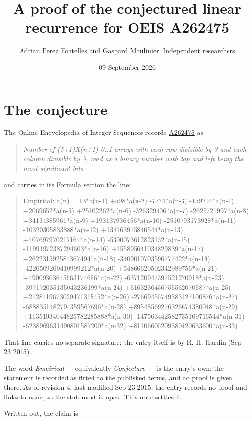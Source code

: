 \documentclass[11pt]{article}
\title{A proof of the conjectured linear recurrence for OEIS A262475}
\author{Adrian Perez Fontelles and Gaspard Moulinier, Independent researchers}
\date{09 September 2026}
\theoremstyle{definition}
\begin{document}
\maketitle
\section{The conjecture}

The Online Encyclopedia of Integer Sequences records \href{https://oeis.org/A262475}{A262475} as

\begin{quote}\itshape Number of (5+1)X(n+1) 0..1 arrays with each row divisible by 3 and each column divisible by 5, read as a binary number with top and left being the most significant bits\end{quote}

and carries in its Formula section the line:

\begin{quote}\ttfamily Empirical: a(n) = 13*a(n-1) +598*a(n-2) -7774*a(n-3) -159204*a(n-4) +2069652*a(n-5) +25102262*a(n-6) -326329406*a(n-7) -2625721997*a(n-8) +34134385961*a(n-9) +193137936456*a(n-10) -2510793173928*a(n-11) -10320305833888*a(n-12) +134163975840544*a(n-13) +407697970217164*a(n-14) -5300073612823132*a(n-15) -11991972387294603*a(n-16) +155895641034829839*a(n-17) +262231592584367494*a(n-18) -3409010703596777422*a(n-19) -4220509269410999212*a(n-20) +54866620502342989756*a(n-21) +49009303645963174686*a(n-22) -637120947397521270918*a(n-23) -397172035135043236199*a(n-24) +5163236456755562070587*a(n-25) +2128419673029471315452*a(n-26) -27669455749383127100876*a(n-27) -6888351482794359567696*a(n-28) +89548569276326674380048*a(n-29) +11351034044825782285888*a(n-30) -147563442582735169716544*a(n-31) -6238969631490801587200*a(n-32) +81106605209380420633600*a(n-33)\end{quote}

That line carries no separate signature; the entry itself is by R. H. Hardin (Sep 23 2015).

The word {\itshape Empirical} --- equivalently {\itshape Conjecture} --- is the entry's own: the statement is recorded as fitted to the published terms, and no proof is given there. As of revision 4, last modified Sep 23 2015, the entry records no proof and links to none, so the statement is open. This note settles it.

Written out, the claim is
\end{document}
